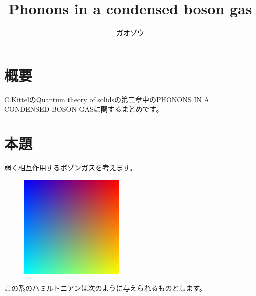 \documentclass[uplatex,dvipdfmx]{jsarticle}
\title{Phonons in a condensed boson gas}
\author{ガオゾウ}
\begin{document}
\maketitle
\section{概要}
C.KittelのQuantum theory of solidsの第二章中のPHONONS IN A CONDENSED BOSON GASに関するまとめです。

\section{本題}
弱く相互作用するボゾンガスを考えます。
\begin{figure}[htbp]
	\includegraphics[width=5cm]{sample.jpg}
\end{figure}

この系のハミルトニアンは次のように与えられるものとします。
\end{document}
